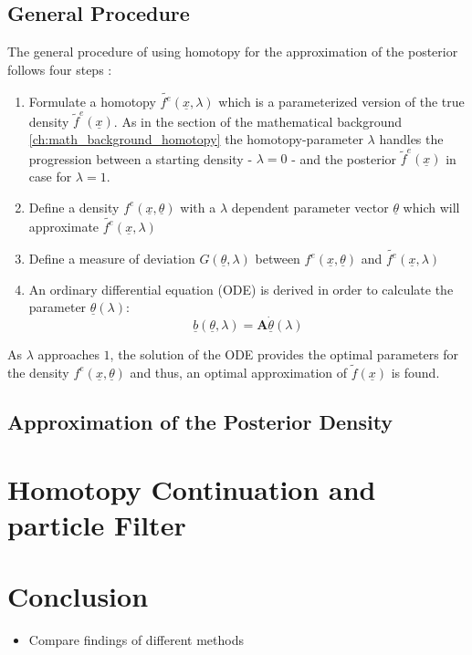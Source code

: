 \documentclass[a4paper]{IEEEtran}
\begin{document}
\subsection{General Procedure}
\label{ch:general_idea_homotopy}
The general procedure of using homotopy for the approximation of the posterior follows four steps \cite{hanebeck2003}:
\begin{enumerate}
    \item Formulate a homotopy $\tilde{f^e}(\underline{x},\lambda)$ which is a parameterized version of the true density $\tilde{f}^{e}(\underline{x})$. As in the section of the mathematical background \ref{ch:math_background_homotopy}
    the homotopy-parameter $\lambda$ handles the progression between a starting density - $\lambda = 0$ - and the posterior $\tilde{f}^e(\underline{x})$ in case for $\lambda = 1$.
    \item Define a density $f^e(\underline{x}, \underline{\theta})$ with a $\lambda$ dependent parameter vector $\underline{\theta}$ which will approximate $\tilde{f^e}(\underline{x},\lambda)$
    \item Define a measure of deviation $G(\underline{\theta}, \lambda)$ between $f^e(\underline{x}, \underline{\theta})$ and $\tilde{f^e}(\underline{x},\lambda)$
    \item An ordinary differential equation (ODE) is derived in order to calculate the parameter $\underline{\theta}(\lambda)$:
    \begin{equation}
        \underline{b}(\underline{\theta}, \lambda) = \textbf{A}\underline{\dot{\theta}}(\lambda)
    \end{equation}
\end{enumerate}

As $\lambda$ approaches $1$, the solution of the ODE provides the optimal parameters for the density $f^e(\underline{x}, \underline{\theta})$ and thus, an optimal approximation of $\tilde{f}(\underline{x})$ is found.

\subsection{Approximation of the Posterior Density}
\label{ch:homotopy_approximation}

\section{Homotopy Continuation and particle Filter}
\label{ch:homotopy_particle_filter}


\section{Conclusion}
\label{ch:conclusion}
\begin{itemize}
    \item Compare findings of different methods
\end{itemize}




\end{document}
